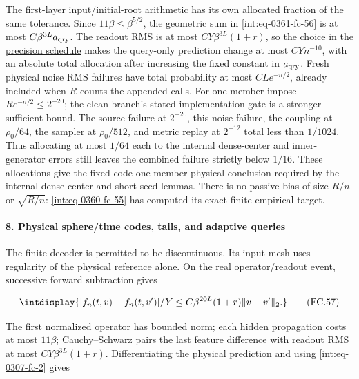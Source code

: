 The first-layer input/initial-root arithmetic has its own allocated fraction of the same tolerance. Since \(11\beta\le\beta^{5/2}\), the geometric sum in \eqref{int:eq-0361-fc-56} is at most \(C\beta^{3L}a_{\rm qry}\). The readout RMS is at most \(CY\beta^{3L}(1+r)\), so the choice in \hyperref[int:decoder-precision-coupling]{the precision schedule} makes the query-only prediction change at most \(CYn^{-10}\), with an absolute total allocation after increasing the fixed constant in \(a_{\rm qry}\). Fresh physical noise RMS failures have total probability at most \(CL e^{-n/2}\), already included when \(R\) counts the appended calls. For one member impose \(Re^{-n/2}\le2^{-20}\); the clean branch's stated implementation gate is a stronger sufficient bound. The source failure at \(2^{-20}\), this noise failure, the coupling at \(\rho_0/64\), the sampler at \(\rho_0/512\), and metric replay at \(2^{-12}\) total less than \(1/1024\). Thus allocating at most \(1/64\) each to the internal dense-center and inner-generator errors still leaves the combined failure strictly below \(1/16\). These allocations give the fixed-code one-member physical conclusion required by the internal dense-center and short-seed lemmas. There is no passive bias of size \(R/n\) or \(\sqrt{R/n}\): \eqref{int:eq-0360-fc-55} has computed its exact finite empirical target.


\paragraph{8. Physical sphere/time codes, tails, and adaptive queries}

\mbox{}\par\smallskip


The finite decoder is permitted to be discontinuous. Its input mesh uses regularity of the physical reference alone. On the real operator/readout event, successive forward subtraction gives


\begingroup\renewcommand{\theHequation}{intdisplay.763}
\begin{equation}
\intdisplay{
|f_n(t,v)-f_n(t,v')|/Y
\le C\beta^{20L}(1+r)\|v-v'\|_2.
}
\tag{FC.57}
\label{int:eq-0362-fc-57}
\end{equation}
\endgroup


The first normalized operator has bounded norm; each hidden propagation costs at most \(11\beta\); Cauchy--Schwarz pairs the last feature difference with readout RMS at most \(CY\beta^{3L}(1+r)\). Differentiating the physical prediction and using \eqref{int:eq-0307-fc-2} gives


